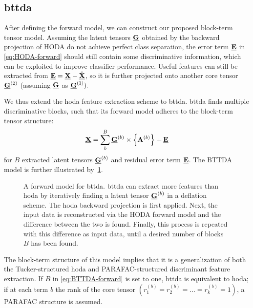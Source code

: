 \documentclass[10pt]{iopart}
\begin{document}
\subsection{\Acl{bttda}}
After defining the forward model, we can construct our proposed block-term
tensor model.
Assuming the latent tensors $\underline{\mathbf{G}}$
obtained by the backward projection of HODA do not achieve perfect
class separation, the error term $\underline{\mathbf{E}}$ in
\cref{eq:HODA-forward} should still contain some discriminative
information, which can be exploited to improve classifier
performance.
Useful features can still be extracted from $\underline{\mathbf{E}} = \underline{\mathbf{X}} -
\hat{\underline{\mathbf{X}}}$, so it is further projected onto another core tensor
$\underline{\mathbf{G}}^{(2)}$ (assuming $\underline{\mathbf{G}}$ as $\underline{\mathbf{G}}^{(1)}).$

We thus extend the \ac{hoda} feature extraction scheme to \acf{bttda}.
\Ac{bttda} finds multiple discriminative blocks, such that its forward
model adheres to the block-term tensor structure:
\begin{equation}
	\underline{\mathbf{X}} = \sum_b^B\underline{\mathbf{G}}^{(b)}\times\left\{\mathbf{A}^{(b)}\right\} + \underline{\mathbf{E}}
	\label{eq:BTTDA-forward}
\end{equation}
for $B$ extracted latent tensors $\underline{\mathbf{G}}^{(b)}$ and residual error term
$\underline{\mathbf{E}}$.
The BTTDA model is further illustrated by~\cref{fig:BTTDA}.
\begin{figure}[t]
  \centering
	
  \caption[A forward model for \acs{bttda}.]{A forward model for \acf{bttda}.
    \Ac{bttda} can extract more features
    than \ac{hoda} by iteratively finding a latent tensor $\underline{\mathbf{G}}^{(b)}$ in a
		deflation scheme.
    The \ac{hoda} backward projection is first applied. Next, the
		input data is reconstructed via the HODA forward model and the
		difference between the two is found.
		Finally, this process is repeated with this difference as input data, until a
		desired number of blocks $B$ has been found.}
	\label{fig:BTTDA}
\end{figure}
The block-term structure of this model implies that it is a generalization of both
the Tucker-structured \ac{hoda} and PARAFAC-structured discriminant feature
extraction.
If $B$ in \cref{eq:BTTDA-forward} is set to one, \ac{bttda} is equivalent to
\ac{hoda}; if at each term $b$ the rank of the core tensor
$(r_1^{(b)}=r_2^{(b)}=\ldots=r_k^{(b)}=1)$, a PARAFAC structure is assumed.
\end{document}
